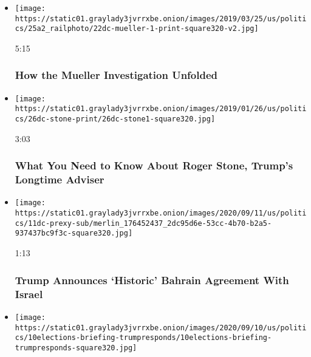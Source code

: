 \begin{itemize}
\item
  \href{https://www.nytimes3xbfgragh.onion/video/us/politics/100000006381390/robert-mueller-report-background.html?action=click\&module=video-series-bar\&region=header\&pgtype=Article\&playlistId=video/us-politics}{}

  \texttt{[image: https://static01.graylady3jvrrxbe.onion/images/2019/03/25/us/politics/25a2\_railphoto/22dc-mueller-1-print-square320-v2.jpg]}

  5:15

  \hypertarget{how-the-mueller-investigation-unfolded}{%
  \subsubsection{How the Mueller Investigation
  Unfolded}\label{how-the-mueller-investigation-unfolded}}
\item
  \href{https://www.nytimes3xbfgragh.onion/video/us/politics/100000006236443/who-is-roger-stone.html?action=click\&module=video-series-bar\&region=header\&pgtype=Article\&playlistId=video/us-politics}{}

  \texttt{[image: https://static01.graylady3jvrrxbe.onion/images/2019/01/26/us/politics/26dc-stone-print/26dc-stone1-square320.jpg]}

  3:03

  \hypertarget{what-you-need-to-know-about-roger-stone-trumps-longtime-adviser}{%
  \subsubsection{What You Need to Know About Roger Stone, Trump's
  Longtime
  Adviser}\label{what-you-need-to-know-about-roger-stone-trumps-longtime-adviser}}
\item
  \href{https://www.nytimes3xbfgragh.onion/video/us/politics/100000007336256/trump-bahrain-israel.html?action=click\&module=video-series-bar\&region=header\&pgtype=Article\&playlistId=video/us-politics}{}

  \texttt{[image: https://static01.graylady3jvrrxbe.onion/images/2020/09/11/us/politics/11dc-prexy-sub/merlin\_176452437\_2dc95d6e-53cc-4b70-b2a5-937437bc9f3c-square320.jpg]}

  1:13

  \hypertarget{trump-announces-historic-bahrain-agreement-with-israel}{%
  \subsubsection{Trump Announces `Historic' Bahrain Agreement With
  Israel}\label{trump-announces-historic-bahrain-agreement-with-israel}}
\item
  \texttt{[image: https://static01.graylady3jvrrxbe.onion/images/2020/09/10/us/politics/10elections-briefing-trumpresponds/10elections-briefing-trumpresponds-square320.jpg]}


\end{itemize}
